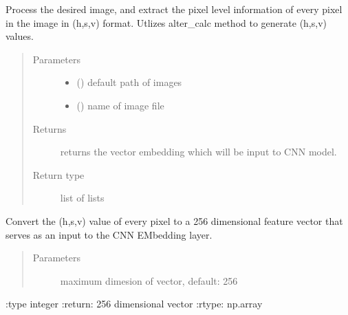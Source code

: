 \documentclass[letterpaper,10pt,english]{sphinxmanual}
\begin{document}
\begin{fulllineitems}
\label{\detokenize{pyleaf.basefunctions:pyleaf.basefunctions.image_area_calculator}}
Process the desired image, and extract the pixel level information of every pixel in the image in (h,s,v) format.
Utlizes alter\_calc method to generate (h,s,v) values.
\begin{quote}\begin{description}
\item[{Parameters}] \leavevmode\begin{itemize}
\item {} 
 () \textendash{} default path of images

\item {} 
 () \textendash{} name of image file

\end{itemize}

\item[{Returns}] \leavevmode
returns the vector embedding which will be input to CNN model.

\item[{Return type}] \leavevmode
list of lists

\end{description}\end{quote}

\end{fulllineitems}


\begin{fulllineitems}
\label{\detokenize{pyleaf.basefunctions:pyleaf.basefunctions.kerasTokenizerUnit}}
Convert the (h,s,v) value of every pixel to a 256 dimensional feature vector that serves as an input to the CNN EMbedding layer.
\begin{quote}\begin{description}
\item[{Parameters}] \leavevmode
{} \textendash{} maximum dimesion of vector, default: 256

\end{description}\end{quote}

:type integer
:return: 256 dimensional vector
:rtype: np.array

\end{fulllineitems}
\end{document}
